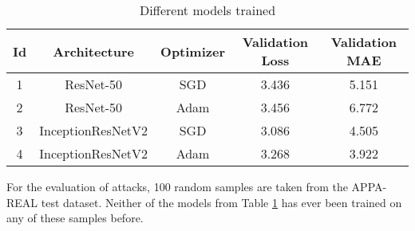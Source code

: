 \begin{table}[]
\centering
\begin{tabular}{|c|c|c|c|c|}
\hline
Id & Architecture & Optimizer & Validation Loss & \textbf{Validation MAE} \\ \hline
1 & ResNet-50 & SGD & 3.436 & 5.151 \\ \hline
2 & ResNet-50 & Adam & 3.456 & 6.772 \\ \hline
3 & InceptionResNetV2 & SGD & 3.086 & 4.505  \\ \hline
4 & InceptionResNetV2 & Adam & 3.268 & 3.922 \\ \hline
\end{tabular}
\caption{Different models trained}
\label{table:trained-models}
\end{table}

For the evaluation of attacks, 100 random samples are taken from the APPA-REAL test dataset. Neither of the models from Table \ref{table:trained-models} has ever been trained on any of these samples before.
